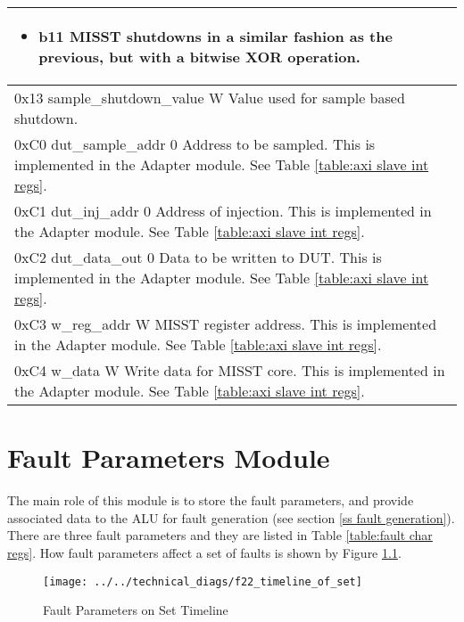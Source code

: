\documentclass[]{report}
\begin{document}
\begin{center}
\begin{longtable}{| p{\linewidth} |}
\begin{itemize}
\begin{itemize}
				\item b11 MISST shutdowns in a similar fashion as the previous, but with a bitwise XOR operation.
			\end{itemize}
		\end{itemize}\\
		\hline
		0x13 sample\_shutdown\_value W \newline
		Value used for sample based shutdown. \\
		\hline
		0xC0 dut\_sample\_addr 0 \newline
		Address to be sampled. This is implemented in the Adapter module. See Table \ref{table:axi slave int regs}. \\
		\hline
		0xC1 dut\_inj\_addr 0 \newline
		Address of injection. This is implemented in the Adapter module. See Table \ref{table:axi slave int regs}.\\
		\hline
		0xC2 dut\_data\_out 0 \newline
		Data to be written to DUT. This is implemented in the Adapter module. See Table \ref{table:axi slave int regs}.\\
		\hline
		0xC3 w\_reg\_addr W \newline
		MISST register address. This is implemented in the Adapter module. See Table \ref{table:axi slave int regs}.\\
		\hline
		0xC4 w\_data W \newline
		Write data for MISST core. This is implemented in the Adapter module. See Table \ref{table:axi slave int regs}.\\
		\hline
	\end{longtable} 
\end{center}

\chapter{Fault Parameters Module}
\label{c fp module}

The main role of this module is to store the fault parameters, and provide associated data to the ALU for fault generation (see section \ref{ss fault generation}). There are three fault parameters and they are listed in Table \ref{table:fault char regs}. How fault parameters affect a set of faults is shown by Figure \ref{fig:case characteristics}.

\begin{figure}[h]
	\centering
	\texttt{[image: ../../technical\_diags/f22\_timeline\_of\_set]}
	\caption{Fault Parameters on Set Timeline}
	\label{fig:case characteristics}
\end{figure}
\end{document}
